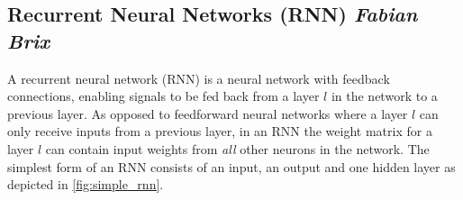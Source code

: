 \subsection*{Recurrent Neural Networks (RNN) \footnotesize\emph{Fabian Brix}}
A recurrent neural network (RNN) is a neural network with feedback connections, enabling signals to be fed back from a layer $l$ in the network to a previous layer. As opposed to feedforward neural networks where a layer $l$ can only receive inputs from a previous layer, in an RNN the weight matrix for a layer $l$ can contain input weights from \emph{all} other neurons in the network. The simplest form of an RNN consists of an input, an output and one hidden layer as depicted in \ref{fig:simple_rnn}.

